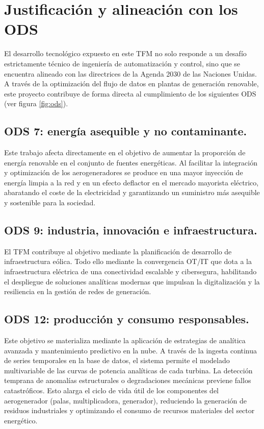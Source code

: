 \section{Justificación y alineación con los \ac{ODS}}
El desarrollo tecnológico expuesto en este \ac{TFM} no solo responde a un desafío estrictamente técnico de ingeniería de automatización y control, sino que se encuentra alineado con las directrices de la Agenda 2030 de las Naciones Unidas. A través de la optimización del flujo de datos en plantas de generación renovable, este proyecto contribuye de forma directa al cumplimiento de los siguientes \ac{ODS} (ver figura \ref{fig:ods}).

\subsection{ODS 7: energía asequible y no contaminante.}
    Este trabajo afecta directamente en el objetivo de aumentar la proporción de energía renovable en el conjunto de fuentes energéticas. Al facilitar la integración y optimización de los aerogeneradores se produce en una mayor inyección de energía limpia a la red y en un efecto deflactor en el mercado mayorista eléctrico, abaratando el coste de la electricidad y garantizando un suministro más asequible y sostenible para la sociedad.

    \subsection{ODS 9: industria, innovación e infraestructura.}
    El \ac{TFM} contribuye al objetivo mediante la planificación de desarrollo de infraestructura eólica.  Todo ello mediante la convergencia \ac{OT}/\ac{IT} que dota a la infraestructura eléctrica de una conectividad  escalable y cibersegura, habilitando el despliegue de soluciones analíticas modernas que impulsan la digitalización y la resiliencia en la gestión de redes de generación.

    \subsection{ODS 12: producción y consumo responsables.}
    Este objetivo se materializa mediante la aplicación de estrategias de analítica avanzada y mantenimiento predictivo en la nube. A través de la ingesta continua de series temporales en la base de datos, el sistema permite el modelado multivariable de las curvas de potencia analíticas de cada turbina. La detección temprana de anomalías estructurales o degradaciones mecánicas previene fallos catastróficos. Esto alarga el ciclo de vida útil de los componentes del aerogenerador (palas, multiplicadora, generador), reduciendo la generación de residuos industriales  y optimizando el consumo de recursos materiales del sector energético.

